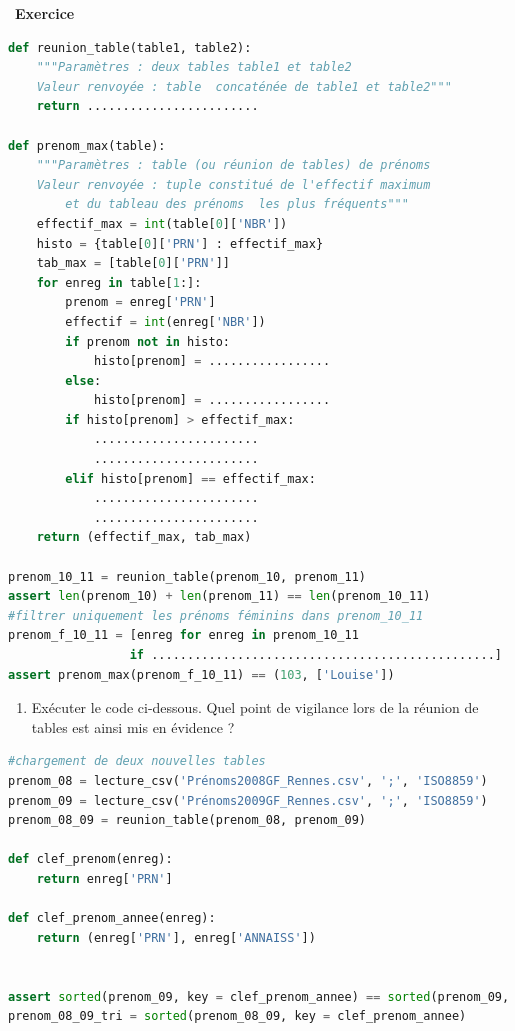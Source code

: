 \documentclass[
  11pt,
]{article}
\providecommand{\tightlist}{%
  \setlength{\itemsep}{0pt}\setlength{\parskip}{0pt}}
\newcounter{exo}
\newenvironment{exercice}[1]
{\par \medskip   \addtocounter{exo}{1} \noindent  
\begin{bclogo}[arrondi =0.1,   noborder = true, logo=\bccrayon, marge=4]{~\textbf{Exercice} \textbf{\theexo} {\itshape #1} }  \par}
{
\end{bclogo}
 \par \bigskip }
\newcounter{def}
\newcounter{histo}
\begin{document}
\begin{exercice}{}
\begin{lstlisting}[language=Python]
def reunion_table(table1, table2):
    """Paramètres : deux tables table1 et table2
    Valeur renvoyée : table  concaténée de table1 et table2"""
    return ........................

def prenom_max(table):
    """Paramètres : table (ou réunion de tables) de prénoms 
    Valeur renvoyée : tuple constitué de l'effectif maximum
        et du tableau des prénoms  les plus fréquents"""
    effectif_max = int(table[0]['NBR'])
    histo = {table[0]['PRN'] : effectif_max}   
    tab_max = [table[0]['PRN']]
    for enreg in table[1:]:
        prenom = enreg['PRN']
        effectif = int(enreg['NBR'])
        if prenom not in histo:
            histo[prenom] = .................
        else:
            histo[prenom] = .................
        if histo[prenom] > effectif_max:
            .......................
            .......................
        elif histo[prenom] == effectif_max:
            .......................
            .......................
    return (effectif_max, tab_max)      

prenom_10_11 = reunion_table(prenom_10, prenom_11)
assert len(prenom_10) + len(prenom_11) == len(prenom_10_11)
#filtrer uniquement les prénoms féminins dans prenom_10_11
prenom_f_10_11 = [enreg for enreg in prenom_10_11 
                 if ................................................]
assert prenom_max(prenom_f_10_11) == (103, ['Louise'])
\end{lstlisting}

\begin{enumerate}
\def\labelenumi{\arabic{enumi}.}
\setcounter{enumi}{5}
\tightlist
\item
  Exécuter le code ci-dessous. Quel point de vigilance lors de la
  réunion de tables est ainsi mis en évidence ?
\end{enumerate}

\begin{lstlisting}[language=Python]
#chargement de deux nouvelles tables
prenom_08 = lecture_csv('Prénoms2008GF_Rennes.csv', ';', 'ISO8859')
prenom_09 = lecture_csv('Prénoms2009GF_Rennes.csv', ';', 'ISO8859')
prenom_08_09 = reunion_table(prenom_08, prenom_09)

def clef_prenom(enreg):
    return enreg['PRN']

def clef_prenom_annee(enreg):
    return (enreg['PRN'], enreg['ANNAISS'])


assert sorted(prenom_09, key = clef_prenom_annee) == sorted(prenom_09, key = clef_prenom)
prenom_08_09_tri = sorted(prenom_08_09, key = clef_prenom_annee) 
\end{lstlisting}


\end{exercice}
\end{document}
